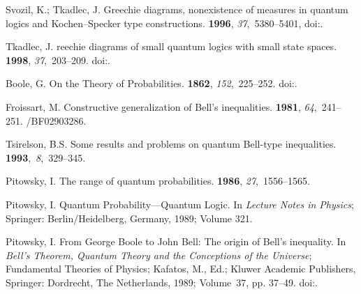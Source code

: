 \begin{thebibliography}{999}
Svozil, K.; Tkadlec, J.
\newblock Greechie diagrams, nonexistence of measures in quantum logics and
 {K}ochen--{S}pecker type constructions.
 {\bf 1996}, {\em
 37},~5380--5401,
\newblock
 doi:{\href{https://doi.org/10.1063/1.531710}{}}.

Tkadlec, J.
reechie diagrams of small quantum logics with small state spaces.
 {\bf 1998}, {\em
 37},~203--209.
\newblock
 doi:{\href{https://doi.org/10.1023/A:1026646229896}{}}.

Boole, G.
\newblock On the Theory of Probabilities.
 {\bf
 1862}, {\em 152},~225--252.
\newblock
 doi:{\href{https://doi.org/10.1098/rstl.1862.0015}{}}.

Froissart, M.
\newblock Constructive generalization of {B}ell's inequalities.
 {\bf 1981}, {\em 64},~241--251.
/BF02903286.

{Tsirelson}, B.S.
\newblock Some results and problems on quantum {B}ell-type inequalities.
 {\bf 1993},~{\em 8},~329--345.

Pitowsky, I.
\newblock The range of quantum probabilities.
 {\bf 1986}, {\em
 27},~1556--1565.

Pitowsky, I.
\newblock Quantum Probability---Quantum Logic. In {\em Lecture
 Notes in Physics}; Springer: Berlin/Heidelberg, Germany, 1989; Volume 321.

Pitowsky, I.
\newblock From {G}eorge {B}oole to {J}ohn {B}ell: The origin of {B}ell's
 inequality. In {\em {B}ell's Theorem, Quantum Theory and the Conceptions of
 the Universe}; Fundamental Theories of
 Physics; Kafatos, M., Ed.; Kluwer Academic Publishers, Springer: Dordrecht, The Netherlands, 1989; Volume~37, pp. 37--49.
\newblock
 doi:{\href{https://doi.org/10.1007/978-94-017-0849-4\_6}{}}.


\end{thebibliography}
